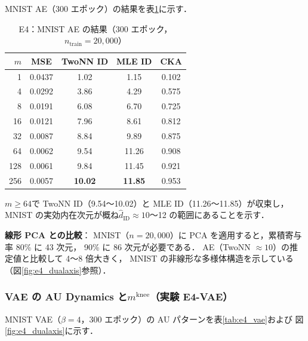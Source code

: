 \documentclass[11pt,a4paper]{jsarticle}
\newcommand{\mknee}{m^{\mathrm{knee}}}
\begin{document}
MNIST AE（300 エポック）の結果を表\ref{tab:e4_ae}に示す．

\begin{table}[H]
\centering
\caption{E4：MNIST AE の結果（300 エポック，$n_{\mathrm{train}}=20{,}000$）}
\label{tab:e4_ae}
\small
\begin{tabular}{rcccc}
\toprule
$m$ & MSE & TwoNN ID & MLE ID & CKA \\
\midrule
1   & 0.0437 & 1.02  & 1.15  & 0.102 \\
4   & 0.0292 & 3.86  & 4.29  & 0.575 \\
8   & 0.0191 & 6.08  & 6.70  & 0.725 \\
16  & 0.0121 & 7.96  & 8.61  & 0.812 \\
32  & 0.0087 & 8.84  & 9.89  & 0.875 \\
64  & 0.0062 & 9.54  & 11.26 & 0.908 \\
128 & 0.0061 & 9.84  & 11.45 & 0.921 \\
256 & 0.0057 & \textbf{10.02} & \textbf{11.85} & 0.953 \\
\bottomrule
\end{tabular}
\end{table}

$m \geq 64$で TwoNN ID（9.54〜10.02）と MLE ID（11.26〜11.85）が収束し，
MNIST の実効内在次元が概ね$\hat{d}_\mathrm{ID} \approx 10$〜12 の範囲にあることを示す．

\textbf{線形 PCA との比較}：
MNIST（$n = 20{,}000$）に PCA を適用すると，累積寄与率 80\% に 43 次元，
90\% に 86 次元が必要である．
AE（TwoNN $\approx 10$）の推定値と比較して 4〜8 倍大きく，
MNIST の非線形な多様体構造を示している（図\ref{fig:e4_dualaxis}参照）．

\subsubsection{VAE の AU Dynamics と$\mknee$（実験 E4-VAE）}

MNIST VAE（$\beta = 4$，300 エポック）の AU パターンを表\ref{tab:e4_vae}および
図\ref{fig:e4_dualaxis}に示す．
\end{document}
